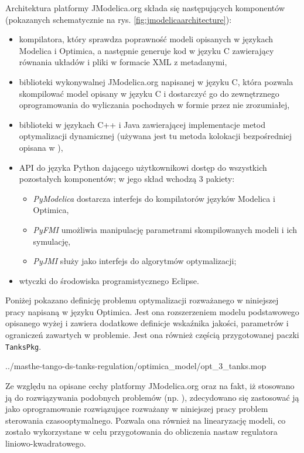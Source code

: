 Architektura platformy JModelica.org składa się następujących komponentów (pokazanych schematycznie na rys. \ref{fig:jmodelicaarchitecture}):
\begin{itemize}
    \item kompilatora, który sprawdza poprawność modeli opisanych w językach Modelica i Optimica, a następnie generuje kod w języku C zawierający równania układów i pliki w formacie XML z metadanymi,
    \item biblioteki wykonywalnej JModelica.org napisanej w języku C, która pozwala skompilować model opisany w języku C i dostarczyć go do zewnętrznego oprogramowania do wyliczania pochodnych w formie przez nie zrozumiałej,
    \item biblioteki w językach C++ i Java zawierającej implementacje metod optymalizacji dynamicznej (używana jest tu metoda kolokacji bezpośredniej opisana w \cite{ake+10cace}),
    \item API do języka Python dającego użytkownikowi dostęp do wszystkich pozostałych komponentów; w jego skład wchodzą 3 pakiety:
    \begin{itemize}
        \item \emph{PyModelica} dostarcza interfejs do kompilatorów języków Modelica i Optimica,
        \item \emph{PyFMI} umożliwia manipulację parametrami skompilowanych modeli i ich symulację,
        \item \emph{PyJMI} służy jako interfejs do algorytmów optymalizacji;
    \end{itemize}
    \item wtyczki do środowiska programistycznego Eclipse.
\end{itemize}

Poniżej pokazano definicję problemu optymalizacji rozważanego w niniejszej pracy napisaną w języku Optimica.
Jest ona rozszerzeniem modelu podstawowego opisanego wyżej i zawiera dodatkowe definicje wskaźnika jakości, parametrów i ograniczeń zawartych w problemie. Jest ona również częścią przygotowanej paczki \texttt{TanksPkg}.


{../masthe-tango-ds-tanks-regulation/optimica_model/opt_3_tanks.mop}

Ze względu na opisane cechy platformy JModelica.org oraz na fakt, iż stosowano ją do rozwiązywania podobnych problemów (np. \cite{Hast09}), zdecydowano się zastosować ją jako oprogramowanie rozwiązujące rozważany w niniejszej pracy problem sterowania czasooptymalnego. Pozwala ona również na linearyzację modeli, co zostało wykorzystane w celu przygotowania do obliczenia nastaw regulatora liniowo-kwadratowego.

